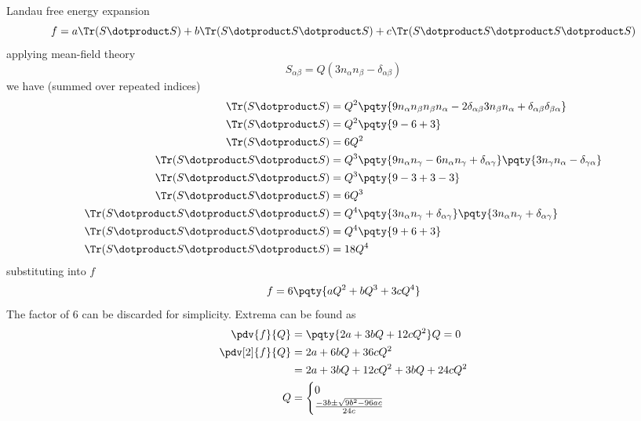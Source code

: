 \documentclass[12pt]{article}
\begin{document}
        \subsubsection{} Landau free energy expansion \[
            f = a \Tr(S \dotproduct S) + b \Tr(S \dotproduct S \dotproduct S) + c \Tr(S \dotproduct S\dotproduct S \dotproduct S) 
        \]
        applying mean-field theory \[
            S_{\alpha \beta} = Q(3n_\alpha n_\beta - \delta_{\alpha \beta})
        \]
        we have (summed over repeated indices)\begin{align*}
            \Tr(S \dotproduct S) &= Q^2\pqty{9n_\alpha n_\beta n_\beta n_\alpha - 2\delta_{\alpha \beta} 3 n_\beta n_\alpha + \delta_{\alpha\beta}\delta_{\beta \alpha}}\\
            \Tr(S \dotproduct S) &= Q^2\pqty{9 - 6 + 3}\\
            \Tr(S \dotproduct S) &= 6Q^2\\
            \Tr(S \dotproduct S \dotproduct S) &= Q^3 \pqty{9n_\alpha n_\gamma - 6n_\alpha n_\gamma + \delta_{\alpha \gamma}}\pqty{3n_\gamma n_\alpha - \delta_{\gamma\alpha}}\\
            \Tr(S \dotproduct S \dotproduct S) &= Q^3 \pqty{9 - 3 + 3- 3}\\
            \Tr(S \dotproduct S \dotproduct S) &= 6Q^3\\
            \Tr(S \dotproduct S \dotproduct S \dotproduct S) &= Q^4\pqty{3n_\alpha n_\gamma + \delta_{\alpha \gamma}}\pqty{3n_\alpha n_\gamma + \delta_{\alpha \gamma}}\\
            \Tr(S \dotproduct S \dotproduct S \dotproduct S) &= Q^4\pqty{9 + 6 + 3}\\
            \Tr(S \dotproduct S \dotproduct S \dotproduct S) &= 18Q^4
        \end{align*}
        substituting into \(f\) \[
            f = 6 \pqty{aQ^2 + bQ^3 + 3cQ^4}
        \]
        The factor of \(6\) can be discarded for simplicity. Extrema can be found as \begin{align*}
            \pdv{f}{Q} &=  \pqty{2a + 3bQ + 12c Q^2}Q =  0\\
            \pdv[2]{f}{Q} &=  {2a + 6bQ + 36c Q^2}\\
            &= 2a + 3bQ + 12cQ^2 + 3bQ + 24cQ^2\\
            Q &= \begin{cases}
                0\\
                \frac{ - 3b\pm \sqrt{9b^2 - 96ac}}{24c} 
            \end{cases}
        \end{align*}
\end{document}
